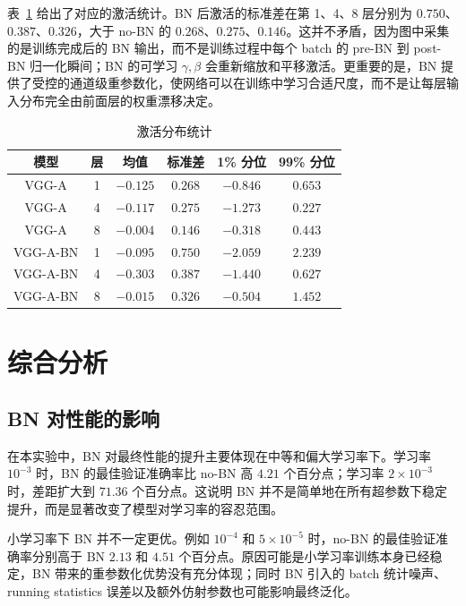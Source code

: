 \documentclass[UTF8,a4paper,11pt]{ctexart}
\begin{document}
表~\ref{tab:activation_stats} 给出了对应的激活统计。BN 后激活的标准差在第 1、4、8 层分别为 $0.750$、$0.387$、$0.326$，大于 no-BN 的 $0.268$、$0.275$、$0.146$。这并不矛盾，因为图中采集的是训练完成后的 BN 输出，而不是训练过程中每个 batch 的 pre-BN 到 post-BN 归一化瞬间；BN 的可学习 $\gamma,\beta$ 会重新缩放和平移激活。更重要的是，BN 提供了受控的通道级重参数化，使网络可以在训练中学习合适尺度，而不是让每层输入分布完全由前面层的权重漂移决定。

\begin{table}[H]
  \centering
  \caption{激活分布统计}
  \label{tab:activation_stats}
  \begin{tabular}{cccccc}
    \toprule
    模型 & 层 & 均值 & 标准差 & 1\% 分位 & 99\% 分位 \\
    \midrule
    VGG-A & 1 & $-0.125$ & $0.268$ & $-0.846$ & $0.653$ \\
    VGG-A & 4 & $-0.117$ & $0.275$ & $-1.273$ & $0.227$ \\
    VGG-A & 8 & $-0.004$ & $0.146$ & $-0.318$ & $0.443$ \\
    VGG-A-BN & 1 & $-0.095$ & $0.750$ & $-2.059$ & $2.239$ \\
    VGG-A-BN & 4 & $-0.303$ & $0.387$ & $-1.440$ & $0.627$ \\
    VGG-A-BN & 8 & $-0.015$ & $0.326$ & $-0.504$ & $1.452$ \\
    \bottomrule
  \end{tabular}
\end{table}

\section{综合分析}

\subsection{BN 对性能的影响}

在本实验中，BN 对最终性能的提升主要体现在中等和偏大学习率下。学习率 $10^{-3}$ 时，BN 的最佳验证准确率比 no-BN 高 $4.21$ 个百分点；学习率 $2\times10^{-3}$ 时，差距扩大到 $71.36$ 个百分点。这说明 BN 并不是简单地在所有超参数下稳定提升，而是显著改变了模型对学习率的容忍范围。

小学习率下 BN 并不一定更优。例如 $10^{-4}$ 和 $5\times10^{-5}$ 时，no-BN 的最佳验证准确率分别高于 BN $2.13$ 和 $4.51$ 个百分点。原因可能是小学习率训练本身已经稳定，BN 带来的重参数化优势没有充分体现；同时 BN 引入的 batch 统计噪声、running statistics 误差以及额外仿射参数也可能影响最终泛化。
\end{document}
